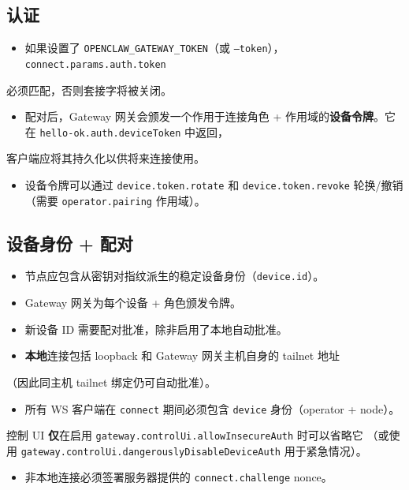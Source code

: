 \subsection{认证}


\begin{itemize}
  \item 如果设置了 \texttt{OPENCLAW\_GATEWAY\_TOKEN}（或 \texttt{--token}），\texttt{connect.params.auth.token}
\end{itemize}

必须匹配，否则套接字将被关闭。
\begin{itemize}
  \item 配对后，Gateway 网关会颁发一个作用于连接角色 + 作用域的\textbf{设备令牌}。它在 \texttt{hello-ok.auth.deviceToken} 中返回，
\end{itemize}

客户端应将其持久化以供将来连接使用。
\begin{itemize}
  \item 设备令牌可以通过 \texttt{device.token.rotate} 和 \texttt{device.token.revoke} 轮换/撤销（需要 \texttt{operator.pairing} 作用域）。
\end{itemize}


\subsection{设备身份 + 配对}


\begin{itemize}
  \item 节点应包含从密钥对指纹派生的稳定设备身份（\texttt{device.id}）。
  \item Gateway 网关为每个设备 + 角色颁发令牌。
  \item 新设备 ID 需要配对批准，除非启用了本地自动批准。
  \item \textbf{本地}连接包括 loopback 和 Gateway 网关主机自身的 tailnet 地址
\end{itemize}

（因此同主机 tailnet 绑定仍可自动批准）。
\begin{itemize}
  \item 所有 WS 客户端在 \texttt{connect} 期间必须包含 \texttt{device} 身份（operator + node）。
\end{itemize}

控制 UI \textbf{仅}在启用 \texttt{gateway.controlUi.allowInsecureAuth} 时可以省略它
（或使用 \texttt{gateway.controlUi.dangerouslyDisableDeviceAuth} 用于紧急情况）。
\begin{itemize}
  \item 非本地连接必须签署服务器提供的 \texttt{connect.challenge} nonce。
\end{itemize}


